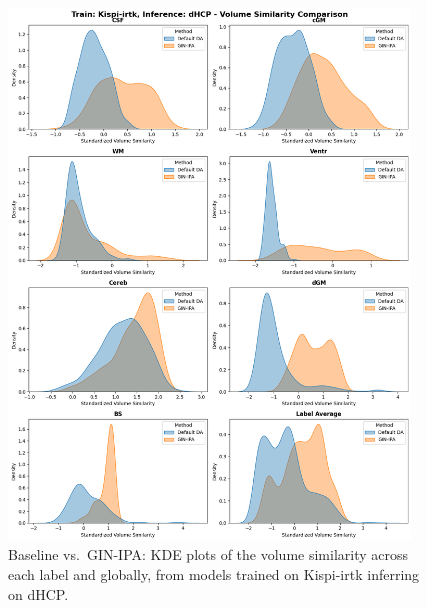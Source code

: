 \begin{figure}[htbp]
    \centering
    \includegraphics[width=0.95\textwidth]{figures/1_irtk-dhcp_VS.png}
    \caption{Baseline vs.\ GIN-IPA: KDE plots of the volume similarity across each label and globally, from models trained on Kispi-irtk inferring on dHCP.}
    \label{fig:1_irtk_dhcp_VS}
\end{figure}

